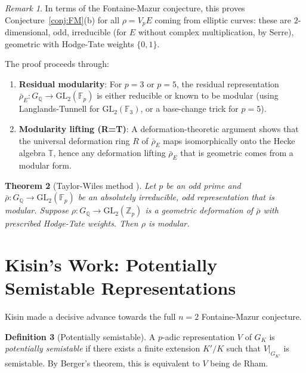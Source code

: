 \documentclass[12pt,a4paper]{amsart}
\newtheorem{theorem}{Theorem}[section]
\theoremstyle{definition}
\newtheorem{definition}[theorem]{Definition}
\theoremstyle{remark}
\newtheorem{remark}[theorem]{Remark}
\newcommand{\GL}{\mathrm{GL}}
\newcommand{\Zp}{\mathbb{Z}_p}
\newcommand{\GQ}{G_{\mathbb{Q}}}
\newcommand{\F}{\mathbb{F}}
\begin{document}
\begin{remark}
  In terms of the Fontaine-Mazur conjecture, this proves Conjecture~\ref{conj:FM}(b) for
  all $\rho = V_p E$ coming from elliptic curves: these are $2$-dimensional, odd,
  irreducible (for $E$ without complex multiplication, by Serre), geometric with
  Hodge-Tate weights $\{0,1\}$.
\end{remark}

The proof proceeds through:
\begin{enumerate}[label=(\roman*)]
  \item \textbf{Residual modularity}: For $p=3$ or $p=5$, the residual representation
    $\bar{\rho}_E \colon \GQ \to \GL_2(\F_p)$ is either reducible or known to be modular
    (using Langlands-Tunnell for $\GL_2(\F_3)$, or a base-change trick for $p=5$).
  \item \textbf{Modularity lifting (R=T)}: A deformation-theoretic argument shows that
    the universal deformation ring $R$ of $\bar{\rho}_E$ maps isomorphically onto the
    Hecke algebra $\mathbb{T}$, hence any deformation lifting $\bar{\rho}_E$ that is
    geometric comes from a modular form.
\end{enumerate}

\begin{theorem}[Taylor-Wiles method \cite{TW1995}]
  Let $p$ be an odd prime and $\bar{\rho}\colon \GQ \to \GL_2(\F_p)$ be an absolutely
  irreducible, odd representation that is modular. Suppose $\rho\colon \GQ \to \GL_2(\Zp)$
  is a geometric deformation of $\bar{\rho}$ with prescribed Hodge-Tate weights.
  Then $\rho$ is modular.
\end{theorem}

\section{Kisin's Work: Potentially Semistable Representations}\label{sec:kisin}

Kisin \cite{Kisin2009} made a decisive advance towards the full $n=2$ Fontaine-Mazur
conjecture.

\begin{definition}[Potentially semistable]
  A $p$-adic representation $V$ of $G_K$ is \emph{potentially semistable} if there
  exists a finite extension $K'/K$ such that $V|_{G_{K'}}$ is semistable.
  By Berger's theorem, this is equivalent to $V$ being de Rham.
\end{definition}
\end{document}
